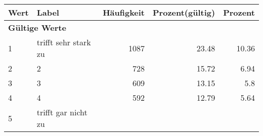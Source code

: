      \begin{longtable}{lXrrr}
     \toprule
     \textbf{Wert} & \textbf{Label} & \textbf{Häufigkeit} & \textbf{Prozent(gültig)} & \textbf{Prozent} \\
     \endhead
     \midrule
     \multicolumn{5}{l}{\textbf{Gültige Werte}}\\

     1 &
     \multicolumn{1}{X}{ trifft sehr stark zu   } &


       \num{1087} &
       \num[round-mode=places,round-precision=2]{23,48} &
         \num[round-mode=places,round-precision=2]{10,36} \\

     2 &
     \multicolumn{1}{X}{ 2   } &


       \num{728} &
       \num[round-mode=places,round-precision=2]{15,72} &
         \num[round-mode=places,round-precision=2]{6,94} \\

     3 &
     \multicolumn{1}{X}{ 3   } &


       \num{609} &
       \num[round-mode=places,round-precision=2]{13,15} &
         \num[round-mode=places,round-precision=2]{5,8} \\

     4 &
     \multicolumn{1}{X}{ 4   } &


       \num{592} &
       \num[round-mode=places,round-precision=2]{12,79} &
         \num[round-mode=places,round-precision=2]{5,64} \\

     5 &
     \multicolumn{1}{X}{ trifft gar nicht zu   } &



\end{longtable}
